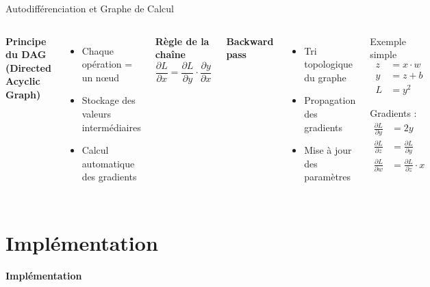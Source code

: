 \documentclass[aspectratio=169,xcolor=dvipsnames]{beamer}
\begin{document}
\begin{frame}{Autodifférenciation et Graphe de Calcul}
\begin{columns}[c]
\textbf{Principe du DAG (Directed Acyclic Graph)}
\begin{itemize}
    \item Chaque opération = un nœud
    \item Stockage des valeurs intermédiaires
    \item Calcul automatique des gradients
\end{itemize}

\vspace{0.3cm}
\textbf{Règle de la chaîne}
\[
\frac{\partial L}{\partial x} = \frac{\partial L}{\partial y} \cdot \frac{\partial y}{\partial x}
\]

\vspace{0.3cm}
\textbf{Backward pass}
\begin{itemize}
    \item Tri topologique du graphe
    \item Propagation des gradients
    \item Mise à jour des paramètres
\end{itemize}

\begin{exampleblock}{Exemple simple}
\begin{align*}
z &= x \cdot w \\
y &= z + b \\
L &= y^2
\end{align*}

\vspace{0.2cm}
Gradients :
\begin{align*}
\frac{\partial L}{\partial y} &= 2y \\
\frac{\partial L}{\partial z} &= \frac{\partial L}{\partial y} \\
\frac{\partial L}{\partial w} &= \frac{\partial L}{\partial z} \cdot x
\end{align*}
\end{exampleblock}
\end{columns}
\end{frame}

\section{Implémentation}
\begin{frame}
    \centering
    \Huge \textbf{Implémentation}
\end{frame}
\end{document}
